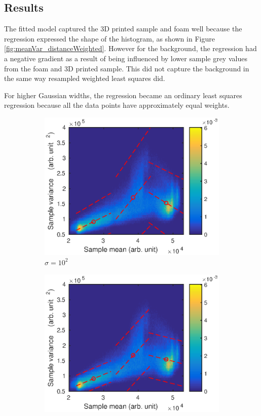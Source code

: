 \documentclass[12pt]{report}
\begin{document}
\subsection{Results}
The fitted model captured the 3D printed sample and foam well because the regression expressed the shape of the histogram, as shown in Figure \ref{fig:meanVar_distanceWeighted}. However for the background, the regression had a negative gradient as a result of being influenced by lower sample grey values from the foam and 3D printed sample. This did not capture the background in the same way resampled weighted least squares did.

For higher Gaussian widths, the regression became an ordinary least squares regression because all the data points have approximately equal weights.

\begin{figure}
	\centering
	\begin{subfigure}{0.45\textwidth}
		\includegraphics[width=\textwidth]{figures/meanVar/gaussian_1.eps}
		\caption{$\sigma=10^2$}
	\end{subfigure}
	\begin{subfigure}{0.45\textwidth}
		\includegraphics[width=\textwidth]{figures/meanVar/gaussian_2.eps}

\end{subfigure}
\end{figure}
\end{document}
